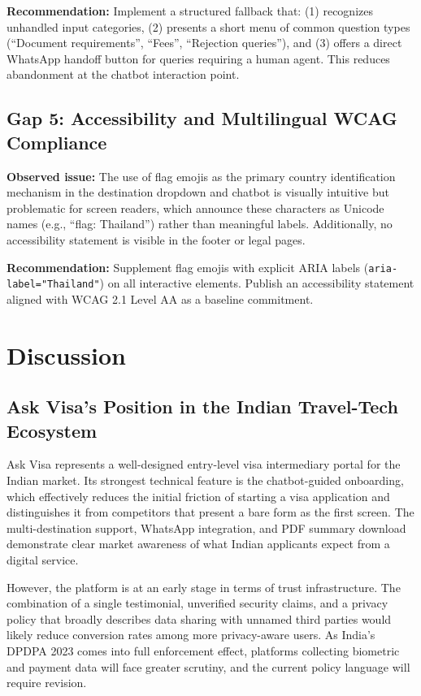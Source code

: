 \documentclass[journal, 10pt, twoside]{IEEEtran}
\begin{document}
\textbf{Recommendation:} Implement a structured fallback that:
(1) recognizes unhandled input categories, (2) presents a short menu
of common question types (``Document requirements'', ``Fees'',
``Rejection queries''), and (3) offers a direct WhatsApp handoff
button for queries requiring a human agent. This reduces abandonment
at the chatbot interaction point.

\subsection{Gap 5: Accessibility and Multilingual WCAG Compliance}
\textbf{Observed issue:} The use of flag emojis as the primary country
identification mechanism in the destination dropdown and chatbot
is visually intuitive but problematic for screen readers, which
announce these characters as Unicode names (e.g., ``flag: Thailand'')
rather than meaningful labels. Additionally, no accessibility
statement is visible in the footer or legal pages.

\textbf{Recommendation:} Supplement flag emojis with explicit ARIA
labels (\texttt{aria-label="Thailand"}) on all interactive elements.
Publish an accessibility statement aligned with WCAG 2.1 Level AA as
a baseline commitment.

\section{Discussion}
\label{sec:discussion}

\subsection{Ask Visa's Position in the Indian Travel-Tech Ecosystem}
Ask Visa represents a well-designed entry-level visa intermediary portal
for the Indian market. Its strongest technical feature is the chatbot-guided
onboarding, which effectively reduces the initial friction of starting a
visa application and distinguishes it from competitors that present a
bare form as the first screen. The multi-destination support, WhatsApp
integration, and PDF summary download demonstrate clear market awareness
of what Indian applicants expect from a digital service.

However, the platform is at an early stage in terms of trust infrastructure.
The combination of a single testimonial, unverified security claims, and a
privacy policy that broadly describes data sharing with unnamed third parties
would likely reduce conversion rates among more privacy-aware users. As
India's DPDPA 2023 comes into full enforcement effect, platforms collecting
biometric and payment data will face greater scrutiny, and the current
policy language will require revision.
\end{document}
